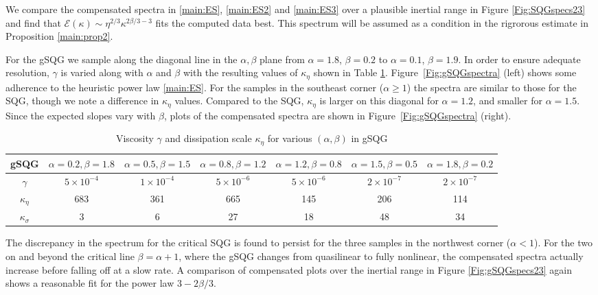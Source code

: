 \documentclass[twoside, reqno]{amsart}
\numberwithin{lemma}{section}
\numberwithin{theorem}{section}
\numberwithin{proposition}{section}
\numberwithin{equation}{section} %
\newcommand{\ka}{\kappa}
\begin{document}
We compare the compensated spectra in \eqref{main:ES}, \eqref{main:ES2} and \eqref{main:ES3} over a plausible inertial range in Figure \ref{Fig:SQGspecs23} and find that 
$\mathcal{E}(\kappa) \sim \eta^{2/3}\ka^{2\beta/{3}-3}$
fits the computed data best. This spectrum will be assumed as a condition in the rigrorous estimate in Proposition \ref{main:prop2}.

  
For the gSQG we sample along the diagonal line in the $ \alpha, \beta $ plane from $ \alpha = 1.8 $, $ \beta = 0.2 $ to $ \alpha = 0.1 $, $ \beta = 1.9$.  In order to ensure adequate resolution, $ \gamma $ is varied along with $\alpha$ and $\beta$ with the resulting values of $\kappa_\eta$ shown in Table \ref{tab:gsqg_parameters}.  Figure~\ref{Fig:gSQGspectra} (left) shows some adherence to the heuristic power law \eqref{main:ES}.   For the samples in the southeast corner ($\alpha\ge 1$) the spectra are similar to those for the SQG, though we note a difference in $\kappa_\eta$ values.  Compared to the SQG, $\kappa_\eta$ is larger on this diagonal for 
$\alpha=1.2$, and smaller for $\alpha=1.5$. Since the expected slopes vary with $\beta$,  plots of the compensated spectra are shown in Figure~\ref{Fig:gSQGspectra} (right).

\vspace{0.1in}


\begin{table}[h!]
\centering
\small
\begin{tabular}{|c|c|c|c|c|c|c|}
\hline
gSQG & \( \alpha=0.2,\beta=1.8 \) & \( \alpha=0.5,\beta=1.5 \) & \( \alpha=0.8,\beta=1.2 \) & \( \alpha=1.2,\beta=0.8 \) & \( \alpha=1.5,\beta=0.5 \) & \( \alpha=1.8,\beta=0.2 \) \\
\hline
\( \gamma \) & \( 5 \times 10^{-4} \) & \( 1 \times 10^{-4} \) & \( 5 \times 10^{-6} \) & \( 5 \times 10^{-6} \) & \( 2 \times 10^{-7} \) & \( 2 \times 10^{-7} \) \\
\hline
\( \kappa_{\eta} \) & 683 & 361 & 665 & 145 & 206 & 114 \\
\hline
\( \kappa_{\sigma} \) & 3 & 6 & 27 & 18 & 48 & 34 \\
\hline
\end{tabular}
\caption{Viscosity \( \gamma \) and dissipation scale \( \kappa_{\eta} \) for various \( (\alpha, \beta) \) in gSQG}
\label{tab:gsqg_parameters}
\end{table}

The discrepancy in the spectrum for the critical SQG is found to persist for the three samples in the northwest corner ($\alpha <1$).  For the two on and beyond the critical line $\beta=\alpha+1$,  where the gSQG changes from quasilinear to fully nonlinear,  the compensated spectra actually increase before falling off at a slow rate.  A comparison of compensated plots over the inertial range in Figure \ref{Fig:gSQGspecs23} again shows a reasonable fit for the power law $3-2\beta/3$.
\end{document}
